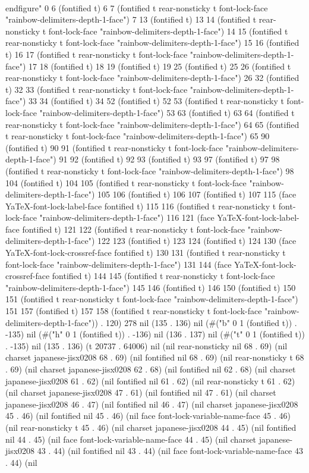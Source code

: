 \\end{figure}" 0 6 (fontified t) 6 7 (fontified t rear-nonsticky t font-lock-face "rainbow-delimiters-depth-1-face") 7 13 (fontified t) 13 14 (fontified t rear-nonsticky t font-lock-face "rainbow-delimiters-depth-1-face") 14 15 (fontified t rear-nonsticky t font-lock-face "rainbow-delimiters-depth-1-face") 15 16 (fontified t) 16 17 (fontified t rear-nonsticky t font-lock-face "rainbow-delimiters-depth-1-face") 17 18 (fontified t) 18 19 (fontified t) 19 25 (fontified t) 25 26 (fontified t rear-nonsticky t font-lock-face "rainbow-delimiters-depth-1-face") 26 32 (fontified t) 32 33 (fontified t rear-nonsticky t font-lock-face "rainbow-delimiters-depth-1-face") 33 34 (fontified t) 34 52 (fontified t) 52 53 (fontified t rear-nonsticky t font-lock-face "rainbow-delimiters-depth-1-face") 53 63 (fontified t) 63 64 (fontified t rear-nonsticky t font-lock-face "rainbow-delimiters-depth-1-face") 64 65 (fontified t rear-nonsticky t font-lock-face "rainbow-delimiters-depth-1-face") 65 90 (fontified t) 90 91 (fontified t rear-nonsticky t font-lock-face "rainbow-delimiters-depth-1-face") 91 92 (fontified t) 92 93 (fontified t) 93 97 (fontified t) 97 98 (fontified t rear-nonsticky t font-lock-face "rainbow-delimiters-depth-1-face") 98 104 (fontified t) 104 105 (fontified t rear-nonsticky t font-lock-face "rainbow-delimiters-depth-1-face") 105 106 (fontified t) 106 107 (fontified t) 107 115 (face YaTeX-font-lock-label-face fontified t) 115 116 (fontified t rear-nonsticky t font-lock-face "rainbow-delimiters-depth-1-face") 116 121 (face YaTeX-font-lock-label-face fontified t) 121 122 (fontified t rear-nonsticky t font-lock-face "rainbow-delimiters-depth-1-face") 122 123 (fontified t) 123 124 (fontified t) 124 130 (face YaTeX-font-lock-crossref-face fontified t) 130 131 (fontified t rear-nonsticky t font-lock-face "rainbow-delimiters-depth-1-face") 131 144 (face YaTeX-font-lock-crossref-face fontified t) 144 145 (fontified t rear-nonsticky t font-lock-face "rainbow-delimiters-depth-1-face") 145 146 (fontified t) 146 150 (fontified t) 150 151 (fontified t rear-nonsticky t font-lock-face "rainbow-delimiters-depth-1-face") 151 157 (fontified t) 157 158 (fontified t rear-nonsticky t font-lock-face "rainbow-delimiters-depth-1-face")) . 120) 278 nil (135 . 136) nil (#("b" 0 1 (fontified t)) . -135) nil (#("h" 0 1 (fontified t)) . -136) nil (136 . 137) nil (#("t" 0 1 (fontified t)) . -135) nil (135 . 136) (t 20737 . 64006) nil (nil rear-nonsticky nil 68 . 69) (nil charset japanese-jisx0208 68 . 69) (nil fontified nil 68 . 69) (nil rear-nonsticky t 68 . 69) (nil charset japanese-jisx0208 62 . 68) (nil fontified nil 62 . 68) (nil charset japanese-jisx0208 61 . 62) (nil fontified nil 61 . 62) (nil rear-nonsticky t 61 . 62) (nil charset japanese-jisx0208 47 . 61) (nil fontified nil 47 . 61) (nil charset japanese-jisx0208 46 . 47) (nil fontified nil 46 . 47) (nil charset japanese-jisx0208 45 . 46) (nil fontified nil 45 . 46) (nil face font-lock-variable-name-face 45 . 46) (nil rear-nonsticky t 45 . 46) (nil charset japanese-jisx0208 44 . 45) (nil fontified nil 44 . 45) (nil face font-lock-variable-name-face 44 . 45) (nil charset japanese-jisx0208 43 . 44) (nil fontified nil 43 . 44) (nil face font-lock-variable-name-face 43 . 44) (nil 